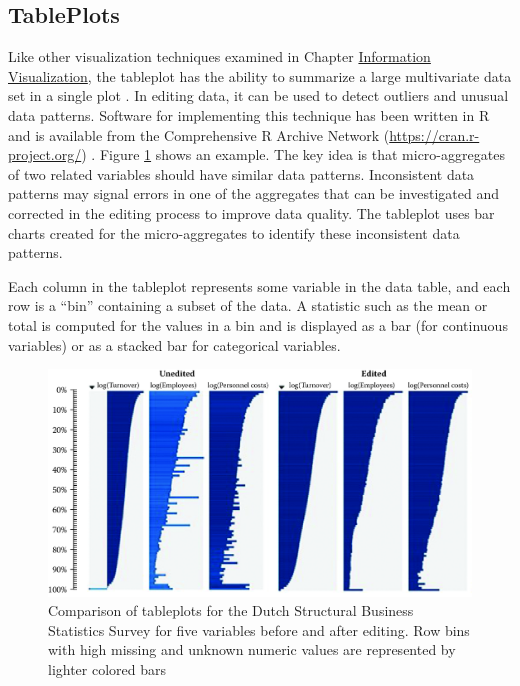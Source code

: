 \documentclass[]{krantz}
\begin{document}
\subsection{TablePlots}\label{tableplots}

Like other visualization techniques examined in Chapter
\protect\hyperlink{chap:viz}{Information Visualization}, the tableplot
has the ability to summarize a large multivariate data set in a single
plot \citep{malik2010interactive}. In editing data, it can be used to
detect outliers and unusual data patterns. Software for implementing
this technique has been written in R and is available from the
Comprehensive R Archive Network (\url{https://cran.r-project.org/})
\citep{cran2013}. Figure \ref{fig:fig10-7} shows an example. The key
idea is that micro-aggregates of two related variables should have
similar data patterns. Inconsistent data patterns may signal errors in
one of the aggregates that can be investigated and corrected in the
editing process to improve data quality. The tableplot uses bar charts
created for the micro-aggregates to identify these inconsistent data
patterns.

Each column in the tableplot represents some variable in the data table,
and each row is a ``bin'' containing a subset of the data. A statistic
such as the mean or total is computed for the values in a bin and is
displayed as a bar (for continuous variables) or as a stacked bar for
categorical variables.

\begin{figure}

{\centering \includegraphics[width=0.9\linewidth]{ChapterError/figures/fig10-7} 

}

\caption{Comparison of tableplots for the Dutch Structural Business Statistics Survey for five variables before and after editing. Row bins with high missing and unknown numeric values are represented by lighter colored bars}\label{fig:fig10-7}
\end{figure}
\end{document}

